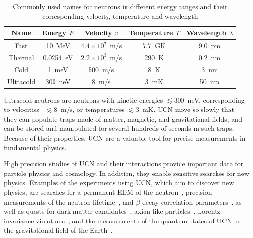 \begin{table}
  \centering
  \begin{tabular}{|c|c|c|c|c|}
    \hline
    Name & Energy $E$ & Velocity $v$ & Temperature $T$ & Wavelength $\lambda$ \\
    \hline
    \hline
    Fast & 10~MeV & $4.4 \times 10^7$~m/s & $7.7$~GK & 9.0~pm \\
    \hline
    Thermal & 0.0254~eV & $ 2.2 \times 10^3$~m/s & 290~K & 0.2~nm \\
    \hline
    Cold & 1~meV & 500~m/s & 8~K & 3~nm \\
    \hline
    Ultracold & 300~neV & 8~m/s & 3~mK & 50~nm \\
    \hline
  \end{tabular}
  \caption[Neutron names in different energy ranges and their
  corresponding velocities, temperatures, and wavelength]{Commonly
    used names for neutrons in different energy ranges and their
    corresponding velocity, temperature and
    wavelength \label{tab:ucnenergy}}
\end{table}


Ultracold neutrons are neutrons with kinetic energies $\lesssim 300$~neV,
corresponding to velocities ~$\lesssim 8$~m/s, or temperatures
$\lesssim 3$~mK. UCN move so slowly that they can populate traps made
of matter, magnetic, and gravitational fields, and can be stored and
manipulated for several hundreds of seconds in such traps. Because of
their properties, UCN are a valuable tool for precise measurements in
fundamental physics.

High precision studies of UCN and their interactions provide important
data for particle physics and cosmology. In addition, they enable
sensitive searches for new physics. Examples of the experiments using
UCN, which aim to discover new physics, are searches for a permanent
EDM of the
neutron~\cite{Baker2006,Serebrov2009,Lam_Gol,Altarev2010,Pendlebury2015},
precision measurements of the neutron
lifetime~\cite{pattie2018measurement,Paul2009,Wietfeldt2011,Arzumanov2000,Serebrov2005,Huffman},
and $\beta$-decay correlation
parameters~\cite{plaster2012measurement,Mendenhall,Broussard}, as well
as quests for dark matter candidates~\cite{Serebrov2008,Zimmer2010},
axion-like particles~\cite{Baessler,Serebrov2010,Afach2015}, Lorentz
invariance violations~\cite{Altarev2009}, and the measurements of the
quantum states of UCN in the gravitational field of the
Earth~\cite{Nesvizhevsky2003}.


